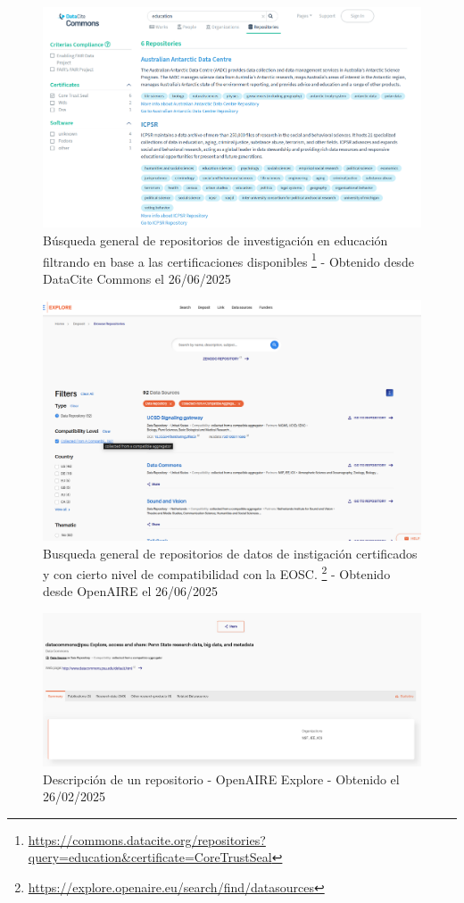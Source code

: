 \documentclass[runningheads]{llncs}
\begin{document}
\begin{figure}
    \centering
    \includegraphics[width=0.5\linewidth]{datacite_commons_gral_search.png}
    \caption{Búsqueda general de repositorios de investigación en educación filtrando en base a las certificaciones disponibles 
    \footnote{\url{https://commons.datacite.org/repositories?query=education&certificate=CoreTrustSeal}}
    - Obtenido desde DataCite Commons el 26/06/2025}
    \label{fig:datacite_commons_gral_search}
\end{figure}

\begin{figure}
    \centering
    \includegraphics[width=0.5\linewidth]{openaire_gral_search.png}
    \caption{
Busqueda general de repositorios de datos de instigación certificados y con cierto nivel de compatibilidad con la EOSC.
    \footnote{\url{https://explore.openaire.eu/search/find/datasources}}
    - Obtenido desde OpenAIRE el 26/06/2025
    }
    \label{fig:openaire_gral_search}
\end{figure}

\begin{figure}
    \centering
    \includegraphics[width=0.5\linewidth]{repositorio_openaire.png}
    \caption{Descripción de un repositorio - OpenAIRE Explore - Obtenido el 26/02/2025}
    \label{fig:repositorio_openaire}
\end{figure}
\end{document}
